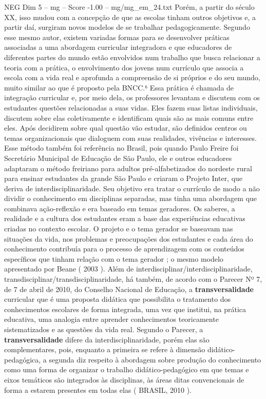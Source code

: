 \begin{textsample}{NEG Dim 5 – mg – Score -1.00 – mg/mg\_em\_24.txt}
Porém, a partir do século XX, isso mudou com a concepção de que as escolas tinham outros objetivos e, a partir daí, surgiram novos modelos de se trabalhar pedagogicamente.
Segundo esse mesmo autor, existem variadas formas para se desenvolver práticas associadas a uma abordagem curricular integradora e que educadores de diferentes partes do mundo estão envolvidos num trabalho que busca relacionar a teoria com a prática, o envolvimento dos jovens num currículo que associa a escola com a vida real e aprofunda a compreensão de si próprios e do seu mundo, muito similar ao que é proposto pela BNCC.⁶ Essa prática é chamada de integração curricular e, por meio dela, os professores levantam e discutem com os estudantes questões relacionadas a suas vidas.
Eles fazem suas listas individuais, discutem sobre elas coletivamente e identificam quais são as mais comuns entre eles.
Após decidirem sobre qual questão vão estudar, são definidos centros ou temas organizacionais que dialoguem com suas realidades, vivências e interesses.
Esse método também foi referência no Brasil, pois quando Paulo Freire foi Secretário Municipal de Educação de São Paulo, ele e outros educadores adaptaram o método freiriano para adultos pré-alfabetizados do nordeste rural para ensinar estudantes da grande São Paulo e criaram o Projeto Inter, que deriva de interdisciplinaridade.
Seu objetivo era tratar o currículo de modo a não dividir o conhecimento em disciplinas separadas, mas tinha uma abordagem que combinava ação-reflexão e era baseado em temas geradores.
Os saberes, a realidade e a cultura dos estudantes eram a base das experiências educativas criadas no contexto escolar.
O projeto e o tema gerador se baseavam nas situações da vida, nos problemas e preocupações dos estudantes e cada área do conhecimento contribuía para o processo de aprendizagem com os conteúdos específicos que tinham relação com o tema gerador ; o mesmo modelo apresentado por Beane ( 2003 ).
Além de interdisciplinar/interdisciplinaridade, transdisciplinar/transdisciplinaridade, há também, de acordo com o Parecer Nº 7, de 7 de abril de 2010, do Conselho Nacional de Educação, a \textbf{transversalidade} curricular que é uma proposta didática que possibilita o tratamento dos conhecimentos escolares de forma integrada, uma vez que institui, na prática educativa, uma analogia entre aprender conhecimentos teoricamente sistematizados e as questões da vida real.
Segundo o Parecer, a \textbf{transversalidade} difere da interdisciplinaridade, porém elas são complementares, pois, enquanto a primeira se refere à dimensão didático-pedagógica, a segunda diz respeito à abordagem sobre produção do conhecimento como uma forma de organizar o trabalho didático-pedagógico em que temas e eixos temáticos são integrados às disciplinas, às áreas ditas convencionais de forma a estarem presentes em todas elas ( BRASIL, 2010 ).

\end{textsample}
